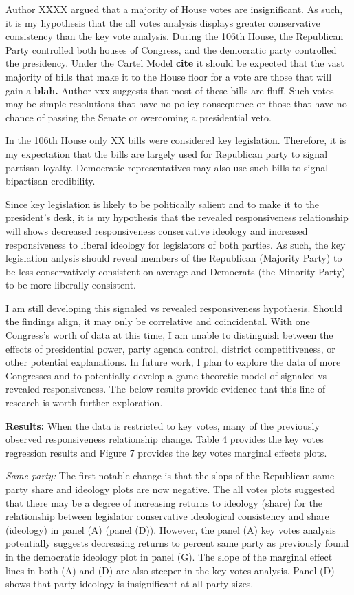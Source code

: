\documentclass[10pt,letterpaper]{article}
\begin{document}
Author XXXX argued that a majority of House votes are insignificant. As such, it is my hypothesis that the all votes analysis displays greater conservative consistency than the key vote analysis. During the 106th House, the Republican Party controlled both houses of Congress, and the democratic party controlled the presidency. Under the Cartel Model \textbf{cite} it should be expected that the vast majority of bills that make it to the House floor for a vote are those that will gain a \textbf{blah.} Author xxx suggests that most of these bills are fluff. Such votes may be simple resolutions that have no policy consequence or those that have no chance of passing the Senate or overcoming a presidential veto. 

In the 106th House only XX bills were considered key legislation. Therefore, it is my expectation that the bills are largely used for Republican party to signal partisan loyalty. Democratic representatives may also use such bills to signal bipartisan credibility.

Since key legislation is likely to be politically salient and to make it to the president's desk, it is my hypothesis that the revealed responsiveness relationship will shows decreased responsiveness conservative ideology and increased responsiveness to liberal ideology for legislators of both parties. As such, the key legislation anlysis should reveal members of the Republican (Majority Party) to be less conservatively consistent on average and Democrats (the Minority Party) to be more liberally consistent.

I am still developing this signaled vs revealed responsiveness hypothesis. Should the findings align, it may only be correlative and coincidental. With one Congress's worth of data at this time, I am unable to distinguish between the effects of presidential power, party agenda control, district competitiveness, or other potential explanations. In future work, I plan to explore the data of more Congresses and to potentially develop a game theoretic model of signaled vs revealed responsiveness. The below results provide evidence that this line of research is worth further exploration.

\textbf{Results:} When the data is restricted to key votes, many of the previously observed responsiveness relationship change. Table 4 provides the key votes regression results and Figure 7 provides the key votes marginal effects plots. 

\textit{Same-party:} The first notable change is that the slops of the Republican same-party share and ideology plots are now negative. The all votes plots suggested that there may be a degree of increasing returns to ideology (share) for the relationship between legislator conservative ideological consistency and share (ideology) in panel (A) (panel (D)). However, the panel (A) key votes analysis potentially suggests decreasing returns to percent same party as previously found in the democratic ideology plot in panel (G).  The slope of the marginal effect lines in both (A) and (D) are also steeper in the key votes analysis. Panel (D) shows that party ideology is insignificant at all party sizes.
\end{document}
